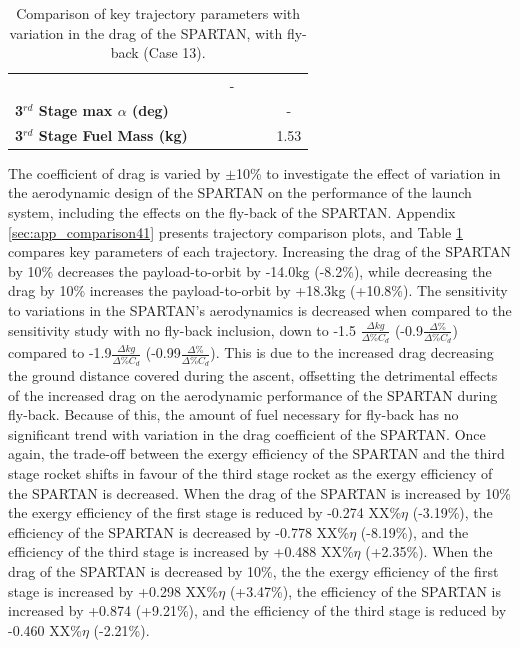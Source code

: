 \begin{table}[ht]
\begin{tabular}{l c c c c c c}
		& \thirdqOverFiveCdOneHundredFive
		& \thirdqOverFiveCdOneHundredTen
		& -
		\\
		\textbf{3$^{rd}$ Stage max $\alpha$ (deg)}
		& \thirdmaxAoACdNinety
		& \thirdmaxAoACdNinetyFive
		& \thirdmaxAoACdStandard
		& \thirdmaxAoACdOneHundredFive
		& \thirdmaxAoACdOneHundredTen
		& -
		\\
		\textbf{3$^{rd}$ Stage Fuel Mass (kg)}
		& \thirdmFuelCdNinety
		& \thirdmFuelCdNinetyFive
		& \thirdmFuelCdStandard
		& \thirdmFuelCdOneHundredFive
		& \thirdmFuelCdOneHundredTen
		&1.53
		\\
		\hline 
	\end{tabular} 
	\caption{Comparison of key trajectory parameters with variation in the drag of the SPARTAN, with fly-back (Case 13).}
	\label{tab:comparison41}
\end{table}


The coefficient of drag is varied by $\pm$10\% to investigate the effect of variation in the aerodynamic design of the SPARTAN on the performance of the launch system, including the effects on the fly-back of the SPARTAN. Appendix \ref{sec:app_comparison41} presents trajectory comparison plots, and Table \ref{tab:comparison41} compares key parameters of each trajectory. 
Increasing the drag of the SPARTAN by 10\% decreases the payload-to-orbit by -14.0kg (-8.2\%), while decreasing the drag by 10\% increases the payload-to-orbit by +18.3kg (+10.8\%). 
The sensitivity to variations in the SPARTAN's aerodynamics is decreased when compared to the sensitivity study with no fly-back inclusion, down to -1.5 $\frac{\Delta kg}{\Delta\% C_{d}}$ (-0.9$\frac{\Delta \%}{\Delta\% C_{d}}$) compared to -1.9$\frac{\Delta kg}{\Delta\% C_{d}}$  (-0.99$\frac{\Delta \%}{\Delta\% C_{d}}$). 
This is due to the increased drag decreasing the ground distance covered during the ascent, offsetting the detrimental effects of the increased drag on the aerodynamic performance of the SPARTAN during fly-back. Because of this, the amount of fuel necessary for fly-back has no significant trend with variation in the drag coefficient of the SPARTAN. 
Once again, the trade-off between the exergy efficiency of the SPARTAN and the third stage rocket shifts in favour of the third stage rocket as the exergy efficiency of the SPARTAN is decreased. When the drag of the SPARTAN is increased by 10\% the exergy efficiency of the first stage is reduced by -0.274 XX\%$\eta$ (-3.19\%), the efficiency of the SPARTAN is decreased by -0.778 XX\%$\eta$ (-8.19\%), and the efficiency of the third stage is increased by +0.488 XX\%$\eta$ (+2.35\%). When the drag of the SPARTAN is decreased by 10\%, the the exergy efficiency of the first stage is increased by +0.298 XX\%$\eta$ (+3.47\%), the efficiency of the SPARTAN is increased by +0.874 (+9.21\%), and the efficiency of the third stage is reduced by -0.460 XX\%$\eta$ (-2.21\%). 



